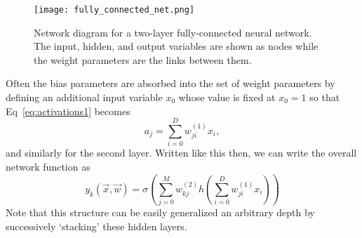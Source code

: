 \documentclass[../main.tex]{subfiles}
\begin{document}
%
\begin{figure}[htbp]
  \centering
  \texttt{[image: fully\_connected\_net.png]}
  \caption{Network diagram for a two-layer fully-connected neural network. The input, hidden, and output variables are
  shown as nodes while the weight parameters are the links between them.}%
\label{fig:fully_connected_net}
\end{figure}
%
Often the bias parameters are absorbed into the set of weight parameters by defining an additional input variable
$x_{0}$ whose value is fixed at $x_{0} = 1$ so that Eq~\ref{eq:activations1} becomes
%
\begin{equation}
  a_{j} = \sum_{i=0}^{D} w_{ji}^{(1)} x_{i},
\end{equation}
%
and similarly for the second layer.
%
Written like this then, we can write the overall network function as
%
\begin{equation}
  y_{k}{(\vec{x}, \vec{w})} = \sigma{\left(\sum_{j=0}^{M}w_{kj}^{(2)}
    h{\left(\sum_{i=0}^{D}w_{ji}^{(1)}x_{i}\right)}\right)}
\end{equation}
%
Note that this structure can be easily generalized an arbitrary depth by successively `stacking' these hidden layers.
%
\end{document}

